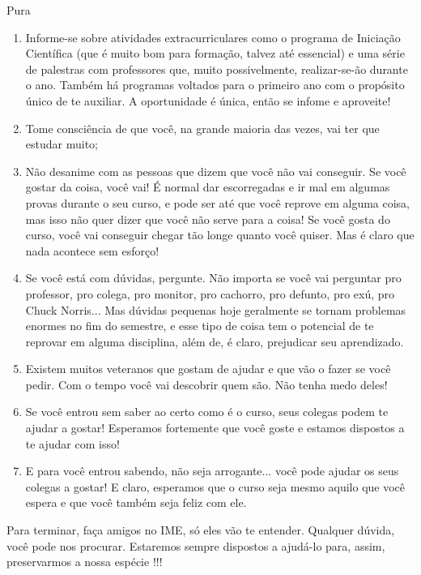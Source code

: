 \begin{subsecao}{Pura}
\begin{enumerate}
\item	Informe-se sobre atividades extracurriculares como o programa de
Iniciação Científica (que é muito bom para formação, talvez até essencial) e
uma série de palestras com professores que, muito possivelmente, realizar-se-ão
durante o ano. Também há programas voltados para o primeiro ano com o propósito único de te auxiliar. A oportunidade é única, então se infome e aproveite!
\item	Tome consciência de que você, na grande maioria das vezes, vai ter que
estudar muito;
\item	Não desanime com as pessoas que dizem que você não vai conseguir. Se você gostar da coisa, você vai! É normal dar escorregadas e ir mal em algumas provas durante o seu curso, e pode ser até que você reprove em alguma coisa, mas isso não quer dizer que você não serve para a coisa! Se você gosta do curso, você vai conseguir chegar tão longe quanto você quiser. Mas é claro que nada acontece sem esforço!
\item Se você está com dúvidas, pergunte. Não importa se você vai perguntar pro professor, pro colega, pro monitor, pro cachorro, pro defunto, pro exú, pro Chuck Norris... Mas dúvidas pequenas hoje geralmente se tornam problemas enormes no fim do semestre, e esse tipo de coisa tem o potencial de te reprovar em alguma disciplina, além de, é claro, prejudicar seu aprendizado.
\item	Existem muitos veteranos que gostam de ajudar e que vão o fazer se você pedir. Com o tempo você vai descobrir quem são. Não tenha medo deles!
\item	Se você entrou sem saber ao certo como é o curso, seus colegas podem te ajudar a gostar! Esperamos fortemente que você goste e estamos dispostos a te ajudar com isso!
\item	E para você entrou sabendo, não seja arrogante... você pode ajudar os seus colegas a gostar! E claro, esperamos que o curso seja mesmo aquilo que você espera e que você também seja feliz com ele.

\end{enumerate}
Para terminar, faça amigos no IME, só eles vão te entender. Qualquer dúvida,
você pode nos procurar. Estaremos sempre dispostos a ajudá-lo para, assim,
preservarmos a nossa espécie !!!


\end{subsecao}
